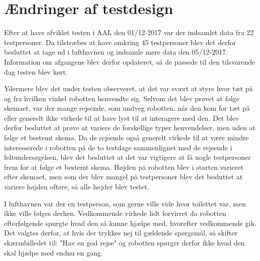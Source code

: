 \section{Ændringer af testdesign}
\label{TestAfSkalaerAendringerTD}
%
Efter at have afviklet testen i AAL den 01/12-2017 var der indsamlet data fra 22 testpersoner. Da tilstræbes at have omkring 45 testpersoner blev det derfor besluttet at tage ud i lufthavnen og indsamle mere data den 05/12-2017. Information om afgangene blev derfor opdateret, så de passede til den tilsvarende dag testen blev kørt. 

Ydermere blev det under testen observeret, at det var svært at styre hvor tæt på og fra hvilken vinkel robotten henvendte sig. Selvom det blev prøvet at følge skemaet, var der mange rejsende, som undveg robotten, når den kom for tæt på eller generelt ikke virkede til at have lyst til at interagere med den. Det blev derfor besluttet at prøve at variere de forskellige typer henvendelser, men uden at følge et bestemt skema. Da de rejsende også generelt virkede til at være mindre interesserede i robotten på de to testdage sammenlignet med de rejsende i feltundersøgelsen, blev det besluttet at det var vigtigere at få nogle testpersoner frem for at følge et bestemt skema. Højden på robotten blev i starten varieret efter skemaet, men som der blev mangel på testpersoner blev det besluttet at variere højden oftere, så alle højder blev testet.

I lufthavnen var der en testperson, som gerne ville vide hvor toilettet var, men ikke ville følges derhen. Vedkommende virkede lidt forvirret da robotten efterfølgende spurgte hvad den så kunne hjælpe med, hvorefter vedkommende gik. Det valgtes derfor, at hvis der trykkes nej til gældende spørgsmål, så skifter skærmbilledet til: "Hav en god rejse" og robotten spørger derfor ikke hvad den skal hjælpe med endnu en gang.


